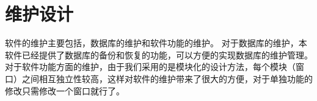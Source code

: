 \chapter{维护设计}
软件的维护主要包括，数据库的维护和软件功能的维护。 对于数据库的维护，本软件已经提供了数据库的备份和恢复的功能，可以方便的实现数据库的维护管理。 对于软件功能方面的维护，由于我们采用的是模块化的设计方法，每个模块（窗口）之间相互独立性较高，这样对软件的维护带来了很大的方便，对于单独功能的修改只需修改一个窗口就行了。
